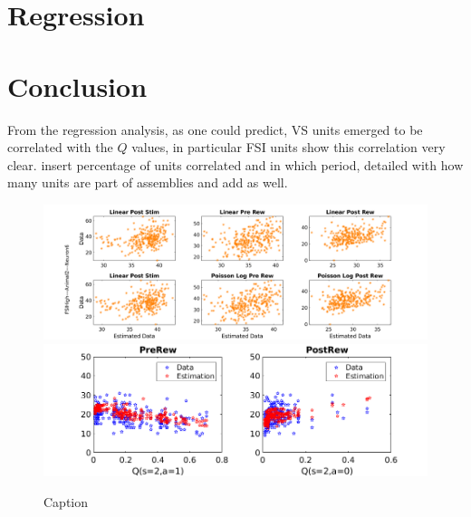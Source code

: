 \section{Regression}
\label{sec:Regression}
\section{Conclusion}
From the regression analysis, as one could predict, VS units emerged to be correlated with the $Q$ values, in particular FSI units show this correlation very clear.
{\color{red}insert percentage of units correlated and in which period, detailed with how many units are part of assemblies and add as well.}
\begin{figure}
    \centering
    \includegraphics[scale=0.3]{figures/y_yhatAnimal2neu6_FSI.png}
    \includegraphics[scale=0.3]{figures/CorrelationExAn1neu6_RightAx.png}
    \caption{Caption}
    \label{fig:my_label}
\end{figure}